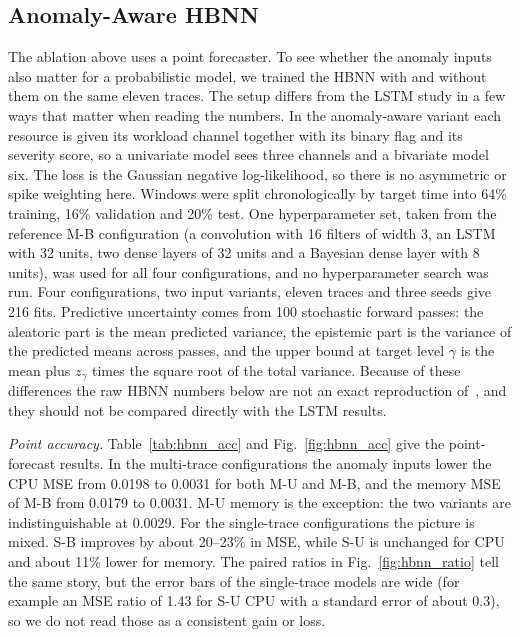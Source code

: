 \subsection{Anomaly-Aware HBNN}
\label{sec:hbnn_results}

The ablation above uses a point forecaster. To see whether the anomaly inputs also matter for a probabilistic model, we trained the HBNN with and without them on the same eleven traces. The setup differs from the LSTM study in a few ways that matter when reading the numbers. In the anomaly-aware variant each resource is given its workload channel together with its binary flag and its severity score, so a univariate model sees three channels and a bivariate model six. The loss is the Gaussian negative log-likelihood, so there is no asymmetric or spike weighting here. Windows were split chronologically by target time into 64\% training, 16\% validation and 20\% test. One hyperparameter set, taken from the reference M-B configuration (a convolution with 16 filters of width 3, an LSTM with 32 units, two dense layers of 32 units and a Bayesian dense layer with 8 units), was used for all four configurations, and no hyperparameter search was run. Four configurations, two input variants, eleven traces and three seeds give 216 fits. Predictive uncertainty comes from 100 stochastic forward passes: the aleatoric part is the mean predicted variance, the epistemic part is the variance of the predicted means across passes, and the upper bound at target level $\gamma$ is the mean plus $z_\gamma$ times the square root of the total variance. Because of these differences the raw HBNN numbers below are not an exact reproduction of~\cite{rossi2025}, and they should not be compared directly with the LSTM results.

\textit{Point accuracy.}
Table~\ref{tab:hbnn_acc} and Fig.~\ref{fig:hbnn_acc} give the point-forecast results. In the multi-trace configurations the anomaly inputs lower the CPU MSE from 0.0198 to 0.0031 for both M-U and M-B, and the memory MSE of M-B from 0.0179 to 0.0031. M-U memory is the exception: the two variants are indistinguishable at 0.0029. For the single-trace configurations the picture is mixed. S-B improves by about 20--23\% in MSE, while S-U is unchanged for CPU and about 11\% lower for memory. The paired ratios in Fig.~\ref{fig:hbnn_ratio} tell the same story, but the error bars of the single-trace models are wide (for example an MSE ratio of 1.43 for S-U CPU with a standard error of about 0.3), so we do not read those as a consistent gain or loss.


